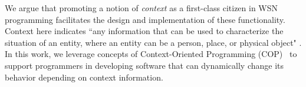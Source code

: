 
We argue that promoting a notion of \emph{context} as a first-class
citizen in WSN programming facilitates the design and implementation
of these functionality. Context here indicates ``any information that
can be used to characterize the situation of an entity, where an
entity can be a person, place, or physical object" \cite{dey99}. In
this work, we leverage concepts of Context-Oriented Programming
(COP)~\cite{hirschfeld08} to support programmers in developing
software that can dynamically change its behavior depending on context
information. %


